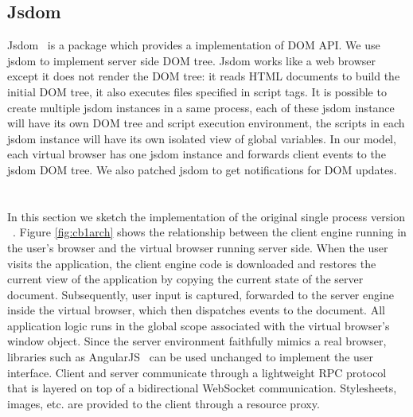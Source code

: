 \subsection{Jsdom}

Jsdom~\cite{JSDOM} is a \nodejs package which provides a \js implementation of 
DOM API. We use jsdom to implement server side DOM tree.
Jsdom works like a web browser except it does not render the DOM tree:
it reads HTML documents to build the initial DOM tree,
it also executes \js files specified in script tags.
It is possible to create multiple jsdom instances in a same process,
each of these jsdom instance will have its own DOM tree and
script execution environment,
the scripts in each jsdom instance will have its own isolated view of global variables.
In our model, each virtual browser has one jsdom instance and
forwards client events to the jsdom DOM tree.
We also patched jsdom to get notifications for DOM updates.


\section{\cb}

\architectureoverview{}

In this section we sketch the implementation of
the original single process version \cb{}~\cite{mcdaniel2012cloudbrowser}.
Figure \ref{fig:cb1arch} shows the relationship
between the client engine running in the user's browser and the virtual browser
running server side.  When the user visits the application, the client engine
code is downloaded and restores the current view of the application by
copying the current state of the server document.  Subsequently, user input
is captured, forwarded to the server engine inside the virtual browser,
which then dispatches events to the document.  All application logic runs
in the global scope associated with the virtual browser's window object.
Since the server environment faithfully mimics a real browser, libraries
such as AngularJS~\cite{hevery2009angular} can be used unchanged to implement the user interface.
Client and server communicate through a lightweight RPC protocol that is
layered on top of a bidirectional WebSocket communication.
Stylesheets, images, etc. are provided to the client through a resource
proxy.

